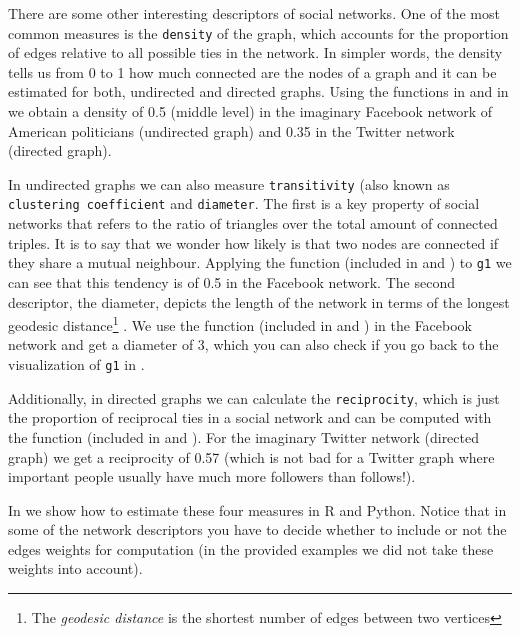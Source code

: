 
There are some other interesting descriptors of social networks. One of the most common measures is the \texttt{density} of the graph, which accounts for the proportion of edges relative to all possible ties in the network. In simpler words, the density tells us from 0 to 1 how much connected are the nodes of a graph and it can be estimated for both, undirected and directed graphs. Using the functions  in  and  in  we obtain a density of 0.5 (middle level) in the imaginary Facebook network of American politicians (undirected graph) and 0.35 in the Twitter network (directed graph). 

In undirected graphs we can also measure \texttt{transitivity} (also known as \texttt{clustering coefficient} and \texttt{diameter}. The first is a key property of social networks that refers to the ratio of triangles over the total amount of connected triples. It is to say that we wonder how likely is that two nodes are connected if they share a mutual neighbour. Applying the function  (included in  and ) to \texttt{g1} we can see that this tendency is of 0.5 in the Facebook network. The second descriptor, the diameter, depicts the length of the network in terms of the longest geodesic distance\footnote{The \textit{geodesic distance} is the shortest number of edges between two vertices} . We use the function  (included in  and ) in the Facebook network and get a diameter of 3, which you can also check if you go back to the visualization of \texttt{g1} in . 

Additionally, in directed graphs we can calculate the \texttt{reciprocity}, which is just the proportion of reciprocal ties in a social network and can be computed with the function  (included in  and ). For the imaginary Twitter network (directed graph) we get a reciprocity of 0.57 (which is not bad for a Twitter graph where important people usually have much more followers than follows!).

In  we show how to estimate these four measures in R and Python. Notice that in some of the network descriptors you have to decide whether to include or not the edges weights for computation (in the provided examples we did not take these weights into account).

